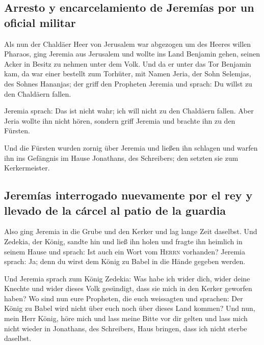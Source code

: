 \hypertarget{arresto-y-encarcelamiento-de-jeremuxedas-por-un-oficial-militar}{%
\subsection{Arresto y encarcelamiento de Jeremías por un oficial
militar}\label{arresto-y-encarcelamiento-de-jeremuxedas-por-un-oficial-militar}}

 Als nun der Chaldäer Heer von Jerusalem war abgezogen um
des Heeres willen Pharaos,  ging Jeremia aus Jerusalem
und wollte ins Land Benjamin gehen, seinen Acker in Besitz zu nehmen
unter dem Volk.  Und da er unter das Tor Benjamin kam, da
war einer bestellt zum Torhüter, mit Namen Jeria, der Sohn Selemjas, des
Sohnes Hananjas; der griff den Propheten Jeremia und sprach: Du willst
zu den Chaldäern fallen.

 Jeremia sprach: Das ist nicht wahr; ich will nicht zu
den Chaldäern fallen. Aber Jeria wollte ihn nicht hören, sondern griff
Jeremia und brachte ihn zu den Fürsten.

 Und die Fürsten wurden zornig über Jeremia und ließen
ihn schlagen und warfen ihn ins Gefängnis im Hause Jonathans, des
Schreibers; den setzten sie zum Kerkermeister.

\hypertarget{jeremuxedas-interrogado-nuevamente-por-el-rey-y-llevado-de-la-cuxe1rcel-al-patio-de-la-guardia}{%
\subsection{Jeremías interrogado nuevamente por el rey y llevado de la
cárcel al patio de la
guardia}\label{jeremuxedas-interrogado-nuevamente-por-el-rey-y-llevado-de-la-cuxe1rcel-al-patio-de-la-guardia}}

 Also ging Jeremia in die Grube und den Kerker und lag
lange Zeit daselbst.  Und Zedekia, der König, sandte hin
und ließ ihn holen und fragte ihn heimlich in seinem Hause und sprach:
Ist auch ein Wort vom \textsc{Herrn} vorhanden? Jeremia sprach: Ja; denn
du wirst dem König zu Babel in die Hände gegeben werden.

 Und Jeremia sprach zum König Zedekia: Was habe ich wider
dich, wider deine Knechte und wider dieses Volk gesündigt, dass sie mich
in den Kerker geworfen haben?  Wo sind nun eure
Propheten, die euch weissagten und sprachen: Der König zu Babel wird
nicht über euch noch über dieses Land kommen?  Und nun,
mein Herr König, höre mich und lass meine Bitte vor dir gelten und lass
mich nicht wieder in Jonathans, des Schreibers, Haus bringen, dass ich
nicht sterbe daselbst.

